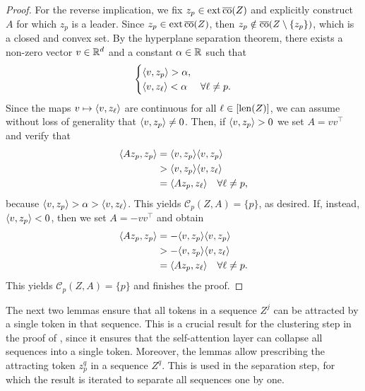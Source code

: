 \documentclass[11pt,a4paper]{amsart}
\begin{document}
\begin{proof}
For the reverse implication, we fix $z_p\in\operatorname{ext}\operatorname{\overline{co}} (Z)$ and explicitly construct $A$ for which $z_p$ is a leader. Since $z_p\in\operatorname{ext}\operatorname{\overline{co}} (Z)$, then $z_p\notin \operatorname{\overline{co}} (Z \setminus \{z_p \})$, which is a closed and convex set. By the hyperplane separation theorem, there exists a non-zero vector $v\in \mathbb{R}^d$ and a constant $\alpha\in \mathbb{R}$ such that
\begin{equation}
\begin{cases} 
   \langle v, z_p \rangle > \alpha, \\ 
   \langle v, z_\ell \rangle < \alpha  &\forall \ell\neq p. 
\end{cases}
\end{equation}
Since the maps $v \mapsto \langle v, z_\ell \rangle$ are continuous for all $\ell \in [\operatorname{len} (Z)]$, we can assume without loss of generality that $\langle v, z_p \rangle \neq 0$. Then, if $\langle v, z_p \rangle > 0$ we set $A = vv^\top$ and verify that
\begin{equation}
    \begin{aligned}
    \langle A z_p, z_p\rangle &= \langle v, z_p \rangle \langle v, z_p \rangle \\
    &> \langle v, z_p \rangle\langle v, z_\ell \rangle \\
    &= \langle Az_p, z_\ell\rangle \quad \forall \ell \neq p,
    \end{aligned}
\end{equation}
because $\langle v, z_p \rangle > \alpha > \langle v, z_\ell \rangle$. This yields $\mathcal{C}_p(Z,A) = \{ p \}$, as desired. If, instead, $\langle v, z_p \rangle < 0$, then we set $A = -vv^\top$ and obtain
\begin{equation}\label{eq:lemleader}
\begin{aligned}
    \langle A z_p, z_p\rangle &= -\langle v, z_p \rangle \langle v, z_p \rangle \\
    &> -\langle v, z_p \rangle\langle v, z_\ell \rangle \\
    &= \langle Az_p, z_\ell\rangle \quad \forall \ell \neq p. 
\end{aligned}
\end{equation}
This yields $\mathcal{C}_p(Z,A) = \{ p \}$ and finishes the proof.
\end{proof}
The next two lemmas ensure that all tokens in a sequence $Z^j$ can be attracted by a single token in that sequence. This is a crucial result for the clustering step in the proof of , since it ensures that the self-attention layer can collapse all sequences into a single token. Moreover, the lemmas allow prescribing the attracting token $z_p^q$ in a sequence $Z^q$. This is used in the separation step, for which the result is iterated to separate all sequences one by one.
\end{document}
